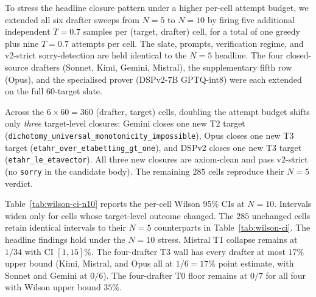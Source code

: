 To stress the headline closure pattern under a higher per-cell
attempt budget, we extended all six drafter sweeps from $N=5$ to
$N=10$ by firing five additional independent $T=0.7$ samples per
(target, drafter) cell, for a total of one greedy plus nine $T=0.7$
attempts per cell. The slate, prompts, verification regime, and
v2-strict sorry-detection are held identical to the $N=5$ headline.
The four closed-source drafters (Sonnet, Kimi, Gemini, Mistral),
the supplementary fifth row (Opus), and the specialised prover
(DSPv2-$7$B GPTQ-int8) were each extended on the full $60$-target
slate.

Across the $6 \times 60 = 360$ (drafter, target) cells, doubling
the attempt budget shifts only \emph{three} target-level closures:
Gemini closes one new T2 target
(\texttt{dichotomy\_\allowbreak universal\_\allowbreak monotonicity\_\allowbreak impossible}), Opus
closes one new T3 target (\texttt{etahr\_over\_etabetting\_gt\_one}),
and DSPv2 closes one new T3 target (\texttt{etahr\_le\_etavector}).
All three new closures are axiom-clean and pass v2-strict (no
\texttt{sorry} in the candidate body). The remaining $285$ cells
reproduce their $N=5$ verdict.

Table~\ref{tab:wilson-ci-n10} reports the per-cell Wilson 95\% CIs
at $N=10$. Intervals widen only for cells whose target-level outcome
changed. The $285$ unchanged cells retain identical intervals to
their $N=5$ counterparts in Table~\ref{tab:wilson-ci}. The headline
findings hold under the $N=10$ stress. Mistral T1 collapse remains
at $1/34$ with CI $[1, 15]\%$. The four-drafter T3 wall has every
drafter at most $17\%$ upper bound (Kimi, Mistral, and Opus all at
$1/6 = 17\%$ point estimate, with Sonnet and Gemini at $0/6$). The
four-drafter T0 floor remains at $0/7$ for all four with Wilson
upper bound $35\%$.

